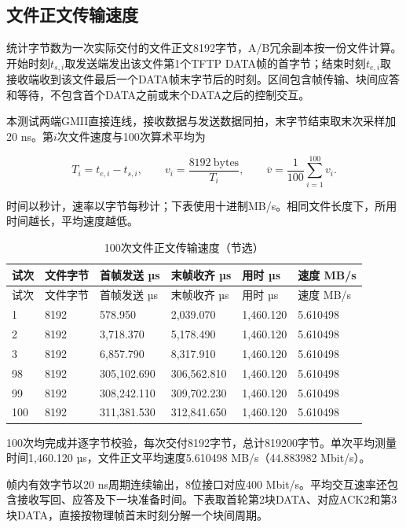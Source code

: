 \subsection{文件正文传输速度}

统计字节数为一次实际交付的文件正文8192字节，A/B冗余副本按一份文件计算。开始时刻$t_{s,i}$取发送端发出该文件第1个TFTP DATA帧的首字节；结束时刻$t_{e,i}$取接收端收到该文件最后一个DATA帧末字节后的时刻。区间包含帧传输、块间应答和等待，不包含首个DATA之前或末个DATA之后的控制交互。

本测试两端GMII直接连线，接收数据与发送数据同拍，末字节结束取末次采样加20 ns。第$i$次文件速度与100次算术平均为

\[T_i=t_{e,i}-t_{s,i},\qquad v_i=\frac{8192\ \mathrm{bytes}}{T_i},\qquad \overline v=\frac{1}{100}\sum_{i=1}^{100}v_i.\]

时间以秒计，速率以字节每秒计；下表使用十进制MB/s。相同文件长度下，所用时间越长，平均速度越低。

\begingroup\small\setlength{\tabcolsep}{3pt}
\begin{longtable}{@{}P{12mm}P{20mm}P{30mm}P{30mm}P{28mm}P{30mm}@{}}
\caption{100次文件正文传输速度（节选）}\\\toprule
试次 & 文件字节 & 首帧发送 µs & 末帧收齐 µs & 用时 µs & 速度 MB/s\\
\midrule\endfirsthead\toprule
试次 & 文件字节 & 首帧发送 µs & 末帧收齐 µs & 用时 µs & 速度 MB/s\\
\midrule{} & 8192 & 578.950 & 2,039.070 & 1,460.120 & 5.610498\\
2 & 8192 & 3,718.370 & 5,178.490 & 1,460.120 & 5.610498\\
3 & 8192 & 6,857.790 & 8,317.910 & 1,460.120 & 5.610498\\
98 & 8192 & 305,102.690 & 306,562.810 & 1,460.120 & 5.610498\\
99 & 8192 & 308,242.110 & 309,702.230 & 1,460.120 & 5.610498\\
100 & 8192 & 311,381.530 & 312,841.650 & 1,460.120 & 5.610498\\
\bottomrule\end{longtable}\endgroup


100次均完成并逐字节校验，每次交付8192字节，总计819200字节。单次平均测量时间1,460.120 µs，文件正文平均速度5.610498 MB/s（44.883982 Mbit/s）。

帧内有效字节以20 ns周期连续输出，8位接口对应400 Mbit/s。平均交互速率还包含接收写回、应答及下一块准备时间。下表取首轮第2块DATA、对应ACK2和第3块DATA，直接按物理帧首末时刻分解一个块间周期。

